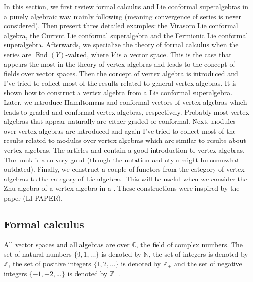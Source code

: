 \documentclass[a4paper, 12pt, reqno]{amsart}
\theoremstyle{remark}
\numberwithin{equation}{subsection}
\DeclareMathOperator{\End}{End}
\begin{document}
In this section, we first review formal calculus and Lie conformal superalgebras in a purely algebraic way mainly following \cite{nozaradan_introduction_2008} (meaning convergence of series is never considered).
Then present three detailed examples: the Virasoro Lie conformal algebra, the Current Lie conformal superalgebra and the Fermionic Lie conformal superalgebra.
Afterwards, we specialize the theory of formal calculus when the series are $\End(V)$-valued, where $V$ is a vector space.
This is the case that appears the most in the theory of vertex algebras and leads to the concept of fields over vector spaces.
Then the concept of vertex algebra is introduced and I've tried to collect most of the results related to general vertex algebras.
It is shown how to construct a vertex algebra from a Lie conformal superalgebra.
Later, we introduce Hamiltonians and conformal vectors of vertex algebras which leads to graded and conformal vertex algebras, respectively.
Probably most vertex algebras that appear naturally are either graded or conformal.
Next, modules over vertex algebras are introduced and again I've tried to collect most of the results related to modules over vertex algebras which are similar to results about vertex algebras.
The articles \cite{de_sole_finite_2006} and \cite{callegaro_introduction_2017} contain a good introduction to vertex algebras.
The book \cite{kac_vertex_1998} is also very good (though the notation and style might be somewhat outdated).
Finally, we construct a couple of functors from the category of vertex algebras to the category of Lie algebras.
This will be useful when we consider the Zhu algebra of a vertex algebra in a .
These constructions were inspired by the paper (LI PAPER).

\subsection{Formal calculus}
\label{sec:formal-calculus}

All vector spaces and all algebras are over $\mathbb{C}$, the field of complex numbers.
The set of natural numbers $\{0, 1, \dots\}$ is denoted by $\mathbb{N}$, the set of integers is denoted by $\mathbb{Z}$, the set of positive integers $\{1, 2, \dots\}$ is denoted by $\mathbb{Z}_+$ and the set of negative integers $\{-1, -2, \dots\}$ is denoted by $\mathbb{Z}_-$.
\end{document}
